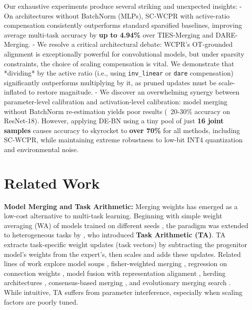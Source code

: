 \documentclass{article}
\theoremstyle{plain}
\theoremstyle{definition}
\theoremstyle{remark}
\begin{document}
Our exhaustive experiments produce several striking and unexpected insights:
- On architectures without BatchNorm (MLPs), SC-WCPR with active-ratio compensation consistently outperforms standard sparsified baselines, improving average multi-task accuracy by \textbf{up to 4.94\%} over TIES-Merging and DARE-Merging.
- We resolve a critical architectural debate: WCPR's OT-grounded alignment is exceptionally powerful for convolutional models, but under sparsity constraints, the choice of scaling compensation is vital. We demonstrate that *dividing* by the active ratio (i.e., using \texttt{inv\_linear} or \texttt{dare} compensation) significantly outperforms multiplying by it, as pruned updates must be scale-inflated to restore magnitude.
- We discover an overwhelming synergy between parameter-level calibration and activation-level calibration: model merging without BatchNorm re-estimation yields poor results (~20-30\% accuracy on ResNet-18). However, applying DE-BN using a tiny pool of just \textbf{16 joint samples} causes accuracy to skyrocket to \textbf{over 70\%} for all methods, including SC-WCPR, while maintaining extreme robustness to low-bit INT4 quantization and environmental noise.

\section{Related Work}
\label{sec:related}

\textbf{Model Merging and Task Arithmetic:} Merging weights has emerged as a low-cost alternative to multi-task learning. Beginning with simple weight averaging (WA) of models trained on different seeds \cite{izmailov2018averaging}, the paradigm was extended to heterogeneous tasks by \citet{ilharco2022editing}, who introduced \textbf{Task Arithmetic (TA)}. TA extracts task-specific weight updates (task vectors) by subtracting the progenitor model's weights from the expert's, then scales and adds these updates. Related lines of work explore model soups \cite{wortsman2022model}, fisher-weighted merging \cite{matena2022merging}, regression on connection weights \cite{jin2022regmean}, model fusion with representation alignment \cite{jordan2022repair, ainsworth2022git}, herding architectures \cite{stoica2023zipit}, consensus-based merging \cite{choshen2023fusing}, and evolutionary merging search \cite{akiba2024evolutionary}. While intuitive, TA suffers from parameter interference, especially when scaling factors are poorly tuned.
\end{document}
